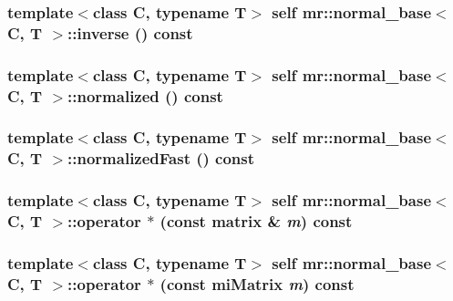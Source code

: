 \subsubsection{\setlength{\rightskip}{0pt plus 5cm}template$<$class C, typename T$>$ {\bf self} {\bf mr::normal\_\-base}$<$ C, T $>$::inverse () const\hspace{0.3cm}{\tt  [inline]}}\label{structmr_1_1normal__base_a15}


\subsubsection{\setlength{\rightskip}{0pt plus 5cm}template$<$class C, typename T$>$ {\bf self} {\bf mr::normal\_\-base}$<$ C, T $>$::normalized () const\hspace{0.3cm}{\tt  [inline]}}\label{structmr_1_1normal__base_a17}


\subsubsection{\setlength{\rightskip}{0pt plus 5cm}template$<$class C, typename T$>$ {\bf self} {\bf mr::normal\_\-base}$<$ C, T $>$::normalized\-Fast () const\hspace{0.3cm}{\tt  [inline]}}\label{structmr_1_1normal__base_a18}


\subsubsection{\setlength{\rightskip}{0pt plus 5cm}template$<$class C, typename T$>$ {\bf self} {\bf mr::normal\_\-base}$<$ C, T $>$::operator $\ast$ (const {\bf matrix} \& {\em m}) const\hspace{0.3cm}{\tt  [inline]}}\label{structmr_1_1normal__base_a20}


\subsubsection{\setlength{\rightskip}{0pt plus 5cm}template$<$class C, typename T$>$ {\bf self} {\bf mr::normal\_\-base}$<$ C, T $>$::operator $\ast$ (const mi\-Matrix {\em m}) const\hspace{0.3cm}{\tt  [inline]}}\label{structmr_1_1normal__base_a19}


